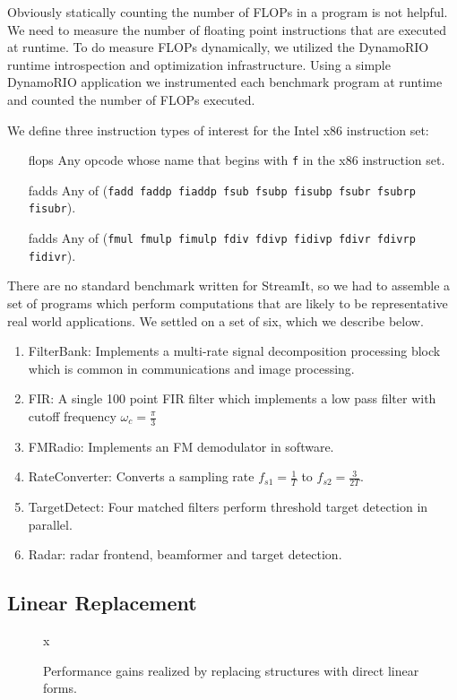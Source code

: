Obviously statically counting the number of FLOPs in a program is not helpful. We 
need to measure the number of floating point instructions that are executed at runtime.
To do measure FLOPs dynamically, we utilized the DynamoRIO\cite{rio-webpage}
runtime introspection and optimization infrastructure. Using a simple DynamoRIO application 
we instrumented each benchmark program at runtime and counted the number of FLOPs executed.


We define three instruction types of interest for the Intel x86 instruction set:
\begin{itemize}
\item[flops] Any opcode whose name that begins with {\tt f} in the x86 instruction set.
\item[fadds] Any of ({\tt fadd faddp fiaddp fsub fsubp fisubp fsubr fsubrp fisubr}).
\item[fadds] Any of ({\tt fmul fmulp fimulp fdiv fdivp fidivp fdivr fdivrp fidivr}).
\end{itemize}

There are no standard benchmark written for StreamIt, so we had to assemble
a set of programs which perform computations that are likely to be representative
real world applications. We settled on a set of six, which we describe below.

\begin{enumerate}
\item FilterBank: Implements a multi-rate signal decomposition processing block which is common in communications and image processing.
\item FIR: A single 100 point FIR filter which implements a low pass filter with cutoff frequency $\omega_c=\frac{\pi}{3}$
\item FMRadio: Implements an FM demodulator in software.
\item RateConverter: Converts a sampling rate $f_{s1}=\frac{1}{T}$ to $f_{s2}=\frac{3}{2T}$.
\item TargetDetect: Four matched filters perform threshold target detection in parallel.
\item Radar: radar frontend, beamformer and target detection.
\end{enumerate}


\subsection{Linear Replacement}

\begin{figure}
x\center
\epsfxsize=3.0in
\caption{Performance gains realized by replacing structures with direct linear forms.}
\label{fig:combination-graph}
\end{figure}


